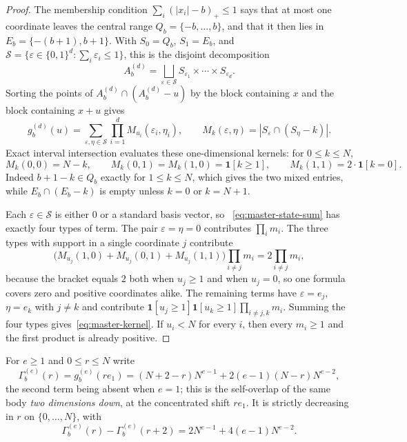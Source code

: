 \documentclass[pdflatex,sn-mathphys-num]{sn-jnl}
\theoremstyle{thmstyleone}
\theoremstyle{thmstylethree}
\theoremstyle{thmstyletwo}
\begin{document}
\begin{proof}
The membership condition $\sum_i(|x_i|-b)_+\le1$ says that at most one
coordinate leaves the central range $Q_b=\{-b,\ldots,b\}$, and that it then
lies in $E_b=\{-(b+1),b+1\}$.  With $S_0=Q_b$, $S_1=E_b$, and
$\mathcal S=\{\varepsilon\in\{0,1\}^d:\sum_i\varepsilon_i\le1\}$, this is the
disjoint decomposition
\[
 A_b^{(d)}=\bigsqcup_{\varepsilon\in\mathcal S}
 S_{\varepsilon_1}\times\cdots\times S_{\varepsilon_d}.
\]
Sorting the points of $A_b^{(d)}\cap(A_b^{(d)}-u)$ by the block containing
$x$ and the block containing $x+u$ gives
\begin{equation}
 g_b^{(d)}(u)
 =\sum_{\varepsilon,\eta\in\mathcal S}
 \prod_{i=1}^dM_{u_i}(\varepsilon_i,\eta_i),
 \qquad
 M_k(\varepsilon,\eta)=|S_\varepsilon\cap(S_\eta-k)|.
 \label{eq:master-state-sum}
\end{equation}
Exact interval intersection evaluates these one-dimensional kernels: for
$0\le k\le N$,
\[
 M_k(0,0)=N-k,\qquad
 M_k(0,1)=M_k(1,0)=\mathbf 1[k\ge1],\qquad
 M_k(1,1)=2\cdot\mathbf 1[k=0].
\]
Indeed $b+1-k\in Q_b$ exactly for $1\le k\le N$, which gives the two mixed
entries, while $E_b\cap(E_b-k)$ is empty unless $k=0$ or $k=N+1$.

Each $\varepsilon\in\mathcal S$ is either $0$ or a standard basis vector, so
~\eqref{eq:master-state-sum} has exactly four types of term.  The pair
$\varepsilon=\eta=0$ contributes $\prod_im_i$.  The three types with support
in a single coordinate $j$ contribute
\[
 \bigl(M_{u_j}(1,0)+M_{u_j}(0,1)+M_{u_j}(1,1)\bigr)\prod_{i\ne j}m_i
 =2\prod_{i\ne j}m_i,
\]
because the bracket equals $2$ both when $u_j\ge1$ and when $u_j=0$, so one
formula covers zero and positive coordinates alike.  The
remaining terms have $\varepsilon=e_j$, $\eta=e_k$ with $j\ne k$ and
contribute $\mathbf 1[u_j\ge1]\mathbf 1[u_k\ge1]\prod_{i\ne j,k}m_i$.
Summing the four types gives~\eqref{eq:master-kernel}.  If $u_i<N$ for every
$i$, then every $m_i\ge1$ and the first product is already positive.
\end{proof}

For $e\ge1$ and $0\le r\le N$ write
\begin{equation}
 \Gamma_b^{(e)}(r)=g_b^{(e)}(re_1)
 =(N+2-r)N^{e-1}+2(e-1)(N-r)N^{e-2},
 \label{eq:gamma}
\end{equation}
the second term being absent when $e=1$; this is the self-overlap of the same
body \emph{two dimensions down}, at the concentrated shift $re_1$.  It is
strictly decreasing in $r$ on $\{0,\ldots,N\}$, with
\begin{equation}
 \Gamma_b^{(e)}(r)-\Gamma_b^{(e)}(r+2)=2N^{e-1}+4(e-1)N^{e-2}.
 \label{eq:gamma-step}
\end{equation}
\end{document}
